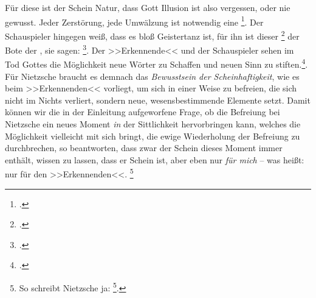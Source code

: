 \documentclass[12pt, a4paper, openany]{report}
\begin{document}
Für diese ist der Schein Natur, dass Gott Illusion ist also vergessen, oder nie gewusst. Jeder Zerstörung, jede Umwälzung ist notwendig eine \footcite[][573]{nietzsche_morgenrote_1999}.
Der Schauspieler hingegen weiß, dass es bloß Geistertanz ist, für ihn ist dieser \footcite[][481]{nietzsche_morgenrote_1999} der Bote der , sie sagen: \footcite[][574]{nietzsche_morgenrote_1999}.
Der >>Erkennende<< und der Schauspieler sehen im Tod Gottes die Möglichkeit neue Wörter zu Schaffen und neuen Sinn zu stiften.\footcite[Vgl.][70]{stephan_nietzscheanismus_2019}. 
Für Nietzsche braucht es demnach das \emph{Bewusstsein der Scheinhaftigkeit}, wie es beim >>Erkennenden<< vorliegt, um sich in einer Weise zu befreien, die sich nicht im Nichts verliert, sondern neue, wesensbestimmende Elemente setzt.
Damit können wir die in der Einleitung aufgeworfene Frage, ob die Befreiung bei Nietzsche ein neues Moment \emph{in} der Sittlichkeit hervorbringen kann, welches die Möglichkeit vielleicht mit sich bringt, die ewige Wiederholung der Befreiung zu durchbrechen, so beantworten, dass zwar der Schein dieses Moment immer enthält, wissen zu lassen, dass er Schein ist, aber eben nur \emph{für mich} -- was heißt: nur für den >>Erkennenden<<.%
\footnote{
    So schreibt Nietzsche ja: \footcite[][S. 417, Hervorhebung von mir]{nietzsche_morgenrote_1999}.
}
\end{document}
